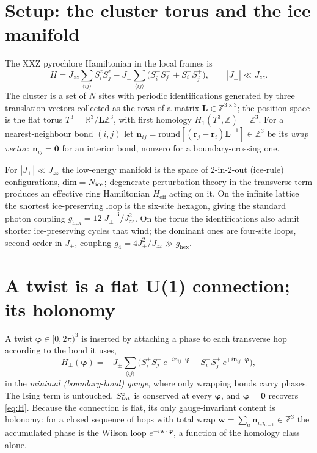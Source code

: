 \documentclass[11pt,letterpaper]{article}
\newcommand{\Jpm}{J_{\pm}}
\newcommand{\Jzz}{J_{zz}}
\newcommand{\bvarphi}{\bm{\varphi}}
\newcommand{\bw}{\mathbf{w}}
\newcommand{\bn}{\mathbf{n}}
\newcommand{\br}{\mathbf{r}}
\newcommand{\bL}{\mathbf{L}}
\newcommand{\Hperp}{H_{\perp}}
\newcommand{\Heff}{H_{\mathrm{eff}}}
\newcommand{\gfour}{g_{4}}
\newcommand{\ghex}{g_{\mathrm{hex}}}
\newcommand{\Z}{\mathbb{Z}}
\newcommand{\twoinout}{2\text{-in-}2\text{-out}}
\theoremstyle{plain}
\theoremstyle{definition}
\begin{document}
\section{Setup: the cluster torus and the ice manifold}
\label{sec:setup}

The XXZ pyrochlore Hamiltonian in the local frames is
\begin{equation}
H=\Jzz\sum_{\langle ij\rangle}S^z_iS^z_j
-\Jpm\sum_{\langle ij\rangle}\bigl(S^+_iS^-_j+S^-_iS^+_j\bigr),
\qquad |\Jpm|\ll\Jzz .
\label{eq:H}
\end{equation}
The cluster is a set of $N$ sites with periodic identifications
generated by three translation vectors collected as the rows of a
matrix $\bL\in\Z^{3\times3}$; the position space is the flat torus
$T^3=\mathbb R^3/\bL\Z^3$, with first homology $H_1(T^3,\Z)=\Z^3$. For a
nearest-neighbour bond $(i,j)$ let $\bn_{ij}=\mathrm{round}
[(\br_j-\br_i)\bL^{-1}]\in\Z^3$ be its \emph{wrap vector}: $\bn_{ij}=\bm
0$ for an interior bond, nonzero for a boundary-crossing one.

For $|\Jpm|\ll\Jzz$ the low-energy manifold is the space of
$\twoinout$ (ice-rule) configurations, $\dim=N_{\rm ice}$; degenerate
perturbation theory in the transverse term produces an effective ring
Hamiltonian $\Heff$ acting on it. On the infinite lattice the shortest
ice-preserving loop is the six-site hexagon, giving the standard photon
coupling $\ghex=12|\Jpm|^3/\Jzz^2$. On the torus the identifications
also admit shorter ice-preserving cycles that wind; the dominant ones
are four-site loops, second order in $\Jpm$, coupling
$\gfour=4\Jpm^2/\Jzz\gg\ghex$.

\section{A twist is a flat U(1) connection; its holonomy}
\label{sec:connection}

A twist $\bvarphi\in[0,2\pi)^3$ is inserted by attaching a phase to each
transverse hop according to the bond it uses,
\begin{equation}
\Hperp(\bvarphi)=-\Jpm\sum_{\langle ij\rangle}
\bigl(S^+_iS^-_j\,e^{-i\bn_{ij}\cdot\bvarphi}
+S^-_iS^+_j\,e^{+i\bn_{ij}\cdot\bvarphi}\bigr),
\label{eq:Htwist}
\end{equation}
in the \emph{minimal (boundary-bond) gauge}, where only wrapping bonds
carry phases. The Ising term is untouched, $S^z_{\rm tot}$ is conserved
at every $\bvarphi$, and $\bvarphi=\bm 0$ recovers \cref{eq:H}. Because
the connection is flat, its only gauge-invariant content is holonomy:
for a closed sequence of hops with total wrap
$\bw=\sum_a\bn_{i_a i_{a+1}}\in\Z^3$ the accumulated phase is the Wilson
loop $e^{-i\bw\cdot\bvarphi}$, a function of the homology class alone.
\end{document}
